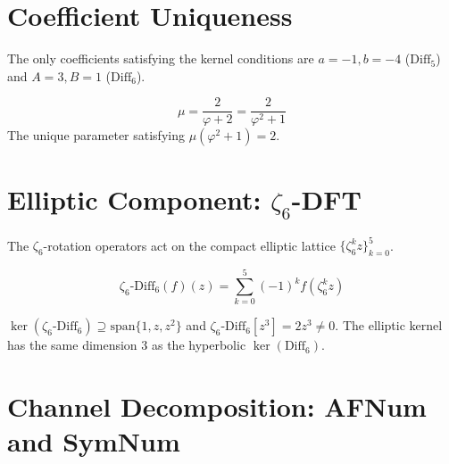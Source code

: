 \section{Coefficient Uniqueness}
\label{sec:coeff_uniqueness}

\begin{theorem}
\label{thm:coeff_uniqueness}
\leanok
The only coefficients satisfying the kernel conditions are $a=-1, b=-4$ ($\mathrm{Diff}_5$) and $A=3, B=1$ ($\mathrm{Diff}_6$).
\end{theorem}

\begin{definition}
\label{def:halfOrderParam}
\leanok
\[
\mu = \frac{2}{\varphi + 2} = \frac{2}{\varphi^2 + 1}
\]
The unique parameter satisfying $\mu(\varphi^2 + 1) = 2$.
\end{definition}

\section{Elliptic Component: \texorpdfstring{$\zeta_6$}{ζ6}-DFT}
\label{sec:zeta6_operators}

The $\zeta_6$-rotation operators act on the compact elliptic lattice $\{\zeta_6^k z\}_{k=0}^5$.

\begin{definition}
\label{def:zeta6_Diff6}
\leanok
\[
\zeta_6\text{-}\mathrm{Diff}_6(f)(z) = \sum_{k=0}^{5} (-1)^k f(\zeta_6^k z)
\]
\end{definition}

\begin{theorem}
\label{thm:zeta6_kernel}
\leanok
$\ker(\zeta_6\text{-}\mathrm{Diff}_6) \supseteq \mathrm{span}\{1, z, z^2\}$ and $\zeta_6\text{-}\mathrm{Diff}_6[z^3] = 2z^3 \neq 0$.
The elliptic kernel has the same dimension 3 as the hyperbolic $\ker(\mathrm{Diff}_6)$.
\end{theorem}

\section{Channel Decomposition: AFNum and SymNum}
\label{sec:channel_decomposition}

